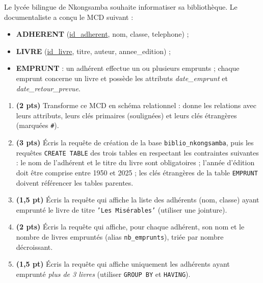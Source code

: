 \documentclass[11pt]{article}
\newcounter{popsec}
\newcounter{popsub}
\newcommand{\courssub}[1]{%
  \stepcounter{popsub}%
  \par\vspace{9pt}\noindent{\popxbold\fontsize{11.5}{13}\selectfont\color{popink}{\color{poporange}\thepopsec.\thepopsub}\hspace{6pt}#1}\par\nopagebreak\vspace{4pt}
}
\begin{document}
\courssub{Je me prépare au Bac}

\begin{exercice}
Le lycée bilingue de Nkongsamba souhaite informatiser sa bibliothèque. Le documentaliste a conçu le MCD suivant :
\begin{itemize}
\item \textbf{ADHERENT} (\underline{id\_adherent}, nom, classe, telephone) ;
\item \textbf{LIVRE} (\underline{id\_livre}, titre, auteur, annee\_edition) ;
\item \textbf{EMPRUNT} : un adhérent effectue un ou plusieurs emprunts ; chaque emprunt concerne un livre et possède les attributs \emph{date\_emprunt} et \emph{date\_retour\_prevue}.
\end{itemize}
\begin{enumerate}
\item \textbf{(2 pts)} Transforme ce MCD en schéma relationnel : donne les relations avec leurs attributs, leurs clés primaires (soulignées) et leurs clés étrangères (marquées \texttt{\#}).
\item \textbf{(3 pts)} Écris la requête de création de la base \texttt{biblio\_nkongsamba}, puis les requêtes \texttt{CREATE TABLE} des trois tables en respectant les contraintes suivantes : le nom de l'adhérent et le titre du livre sont obligatoires ; l'année d'édition doit être comprise entre 1950 et 2025 ; les clés étrangères de la table \texttt{EMPRUNT} doivent référencer les tables parentes.
\item \textbf{(1,5 pt)} Écris la requête qui affiche la liste des adhérents (nom, classe) ayant emprunté le livre de titre \texttt{'Les Misérables'} (utiliser une jointure).
\item \textbf{(2 pts)} Écris la requête qui affiche, pour chaque adhérent, son nom et le nombre de livres empruntés (alias \texttt{nb\_emprunts}), triée par nombre décroissant.
\item \textbf{(1,5 pt)} Écris la requête qui affiche uniquement les adhérents ayant emprunté \emph{plus de 3 livres} (utiliser \texttt{GROUP BY} et \texttt{HAVING}).
\end{enumerate}
\end{exercice}
\end{document}
